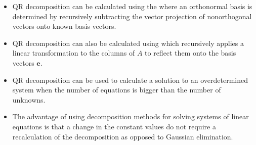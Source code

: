 \documentclass[letterpaper,10pt,english]{jupyterBook}
\begin{document}
\begin{itemize}
\item {} 
\sphinxAtStartPar
QR decomposition can be calculated using the {\hyperref[\detokenize{6_Direct_methods/6.4_QR_decomposition:qr-gramschmidt-definition}]{}} where an orthonormal basis is determined by recursively subtracting the vector projection of non\sphinxhyphen{}orthogonal vectors onto known basis vectors.

\item {} 
\sphinxAtStartPar
QR decomposition can also be calculated using {\hyperref[\detokenize{6_Direct_methods/6.4_QR_decomposition:qr-householder-definition}]{}} which recursively applies a linear transformation to the columns of \(A\) to reflect them onto the basis vectors \(\mathbf{e}\).

\item {} 
\sphinxAtStartPar
QR decomposition can be used to calculate a solution to an overdetermined system when the number of equations is bigger than the number of unknowns.

\item {} 
\sphinxAtStartPar
The advantage of using decomposition methods for solving systems of linear equations is that a change in the constant values do not require a recalculation of the decomposition as opposed to Gaussian elimination.

\end{itemize}

\sphinxstepscope
\end{document}
